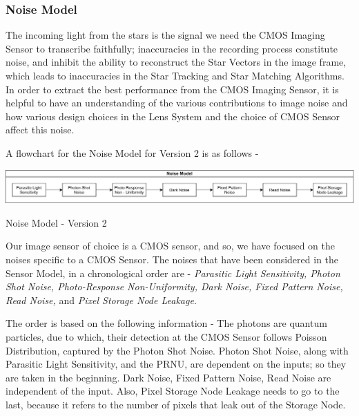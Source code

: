 \documentclass[../../main.tex]{subfiles}
\begin{document}

\subsubsection{Noise Model} %
The incoming light from the stars is the signal we need the CMOS Imaging Sensor to transcribe faithfully; inaccuracies in the recording process constitute noise, and inhibit the ability to reconstruct the Star Vectors in the image frame, which leads to inaccuracies in the Star Tracking and Star Matching Algorithms. In order to extract the best performance from the CMOS Imaging Sensor, it is helpful to have an understanding of the various contributions to image noise and how various design choices in the Lens System and the choice of CMOS Sensor affect this noise. \cite{PLS} 

A flowchart for the Noise Model for Version 2 is as follows -

\begin{Flowchart}[h!]
    \centering
    \includegraphics[scale=0.09]{Figures/Model/Noise Model.png}
    \caption{Noise Model - Version 2}
    \label{fig:SIS_v2_NM}
\end{Flowchart}

Our image sensor of choice is a CMOS sensor, and so, we have focused on the noises specific to a CMOS Sensor. The noises that have been considered in the Sensor Model, in a chronological order are - \emph{Parasitic Light Sensitivity, Photon Shot Noise, Photo-Response Non-Uniformity, Dark Noise, Fixed Pattern Noise, Read Noise,} and \emph{Pixel Storage Node Leakage}.

The order is based on the following information - 
The photons are quantum particles, due to which, their detection at the CMOS Sensor follows Poisson Distribution, captured by the Photon Shot Noise. Photon Shot Noise, along with Parasitic Light Sensitivity, and the PRNU, are dependent on the inputs; so they are taken in the beginning. Dark Noise, Fixed Pattern Noise, Read Noise are independent of the input. Also, Pixel Storage Node Leakage needs to go to the last, because it refers to the number of pixels that leak out of the Storage Node.

\newpage
\end{document}
